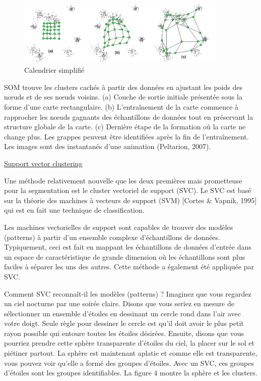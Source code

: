 \documentclass[12pt]{article}
\begin{document}
{%

\begin{figure}[H]
	\centering
    \includegraphics[width=0.9\textwidth]{image10.png}
     \caption{ Calendrier simplifié }
    \label{fig:10}
\end{figure}

SOM trouve les clusters cachés à partir des données en ajustant les poids des nœuds et de ses nœuds voisins. (a) Couche de sortie initiale présentée sous la forme d'une carte rectangulaire. (b)
L'entraînement de la carte commence à rapprocher les nœuds gagnants des échantillons de données tout en préservant la structure globale de la carte. (c) Dernière étape de la formation où la carte ne change plus. Les grappes peuvent être identifiées après la fin de l'entraînement. Les images sont des instantanés d'une animation (Peltarion, 2007).

\underline{Support vector clustering}

Une méthode relativement nouvelle que les deux premières mais prometteuse pour la segmentation est le cluster vectoriel de support (SVC). Le SVC est basé sur la théorie des machines à vecteurs de support (SVM)  {\color{red}[Cortes \& Vapnik, 1995]} qui est en fait une technique de classification.

Les machines vectorielles de support sont capables de trouver des modèles (patterns) à partir d'un ensemble complexe d'échantillons de données. Typiquement, ceci est fait en mappant les échantillons de données d'entrée dans un espace de caractéristique de grande dimension où les échantillons sont plus faciles à séparer les uns des autres. Cette méthode a également été appliquée par SVC.

Comment SVC reconnaît-il les modèles (patterns) ? Imaginez que vous regardez un ciel nocturne par une soirée claire. Disons que vous seriez en mesure de sélectionner un ensemble d'étoiles en dessinant un cercle rond dans l'air avec votre doigt. Seule règle pour dessiner le cercle est qu'il doit avoir le plus petit rayon possible qui entoure toutes les étoiles désirées. Ensuite, disons que vous pourriez prendre cette sphère transparente d'étoiles du ciel, la placer sur le sol et piétiner partout. La sphère est maintenant aplatie et comme elle est transparente, vous pouvez voir qu'elle a formé des groupes d'étoiles. Avec un SVC, ces groupes d'étoiles sont les groupes identifiables. La figure 4 montre la sphère et les clusters.

}
\end{document}
